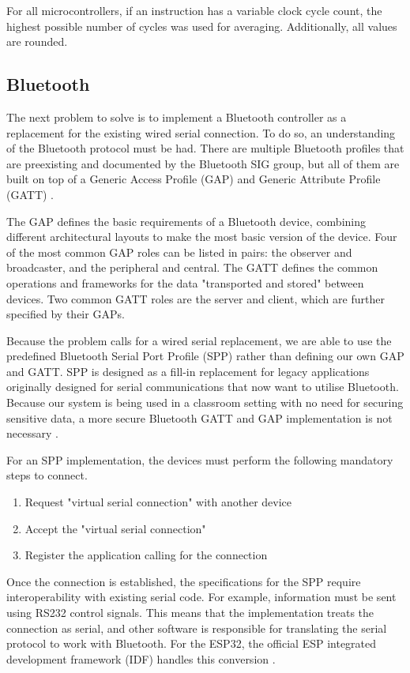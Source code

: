 \documentclass[12pt, titlepage]{article}
\begin{document}
For all microcontrollers, if an instruction has a variable clock cycle count, the highest possible number of cycles was used for averaging. Additionally, all values are rounded.

\subsection{Bluetooth}
The next problem to solve is to implement a Bluetooth controller as a replacement for the existing wired serial connection. To do so, an understanding of the Bluetooth protocol must be had. There are multiple Bluetooth profiles that are preexisting and documented by the Bluetooth SIG group, but all of them are built on top of a Generic Access Profile (GAP) and Generic Attribute Profile (GATT) \cite{bt}.

The GAP defines the basic requirements of a Bluetooth device, combining different architectural layouts to make the most basic version of the device. Four of the most common GAP roles can be listed in pairs: the observer and broadcaster, and the peripheral and central. The GATT defines the common operations and frameworks for the data "transported and stored" between devices. Two common GATT roles are the server and client, which are further specified by their GAPs.

Because the problem calls for a wired serial replacement, we are able to use the predefined Bluetooth Serial Port Profile (SPP) rather than defining our own GAP and GATT. SPP is designed as a fill-in replacement for legacy applications originally designed for serial communications that now want to utilise Bluetooth. Because our system is being used in a classroom setting with no need for securing sensitive data, a more secure Bluetooth GATT and GAP implementation is not necessary \cite{spp}.

For an SPP implementation, the devices must perform the following mandatory steps to connect.

\begin{enumerate}
    \item Request "virtual serial connection" with another device
    \item Accept the "virtual serial connection"
    \item Register the application calling for the connection
\end{enumerate}

Once the connection is established, the specifications for the SPP require interoperability with existing serial code. For example, information must be sent using RS232 control signals. This means that the implementation treats the connection as serial, and other software is responsible for translating the serial protocol to work with Bluetooth. For the ESP32, the official ESP integrated development framework (IDF) handles this conversion \cite{esp-idf}.
\end{document}
